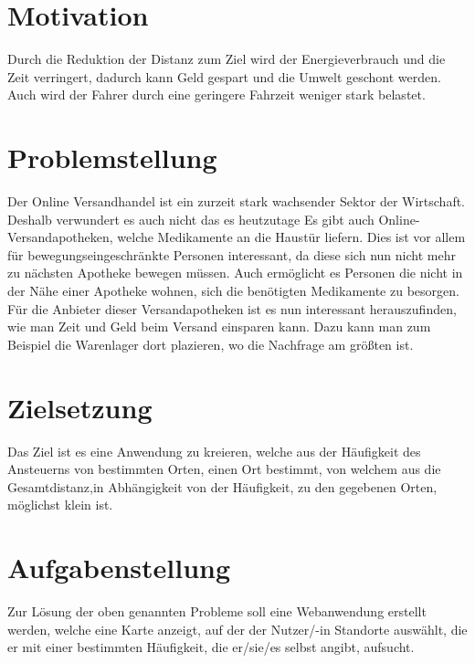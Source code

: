\documentclass[a4paper, twoside, 12pt]{scrreprt}
\begin{document}
\section{Motivation}
Durch die Reduktion der Distanz zum Ziel wird der Energieverbrauch und die Zeit verringert, dadurch kann Geld gespart und die Umwelt geschont werden.
Auch wird der Fahrer durch eine geringere Fahrzeit weniger stark belastet.
\section{Problemstellung}
Der Online Versandhandel ist ein zurzeit stark wachsender Sektor der Wirtschaft.\cite{Stepper2016}
Deshalb verwundert es auch nicht das es heutzutage
Es gibt auch Online-Versandapotheken, welche Medikamente an die Haustür liefern.
Dies ist vor allem für bewegungseingeschränkte Personen interessant, da diese sich nun nicht mehr zu nächsten Apotheke bewegen müssen.
Auch ermöglicht es Personen die nicht in der Nähe einer Apotheke wohnen, sich die benötigten Medikamente zu besorgen.
Für die Anbieter dieser Versandapotheken ist es nun interessant herauszufinden, wie man Zeit und Geld beim Versand einsparen kann.
Dazu kann man zum Beispiel die Warenlager dort plazieren, wo die Nachfrage am größten ist.
\section{Zielsetzung}
Das Ziel ist es eine Anwendung zu kreieren, welche aus der Häufigkeit des Ansteuerns von bestimmten Orten, einen Ort bestimmt, von welchem aus die Gesamtdistanz,in Abhängigkeit von der Häufigkeit, zu den gegebenen Orten, möglichst klein ist.
\section{Aufgabenstellung}
Zur Lösung der oben genannten Probleme soll eine Webanwendung erstellt werden, welche eine Karte anzeigt, auf der der Nutzer/-in Standorte auswählt, die er mit einer bestimmten Häufigkeit, die er/sie/es selbst angibt, aufsucht.
\end{document}

